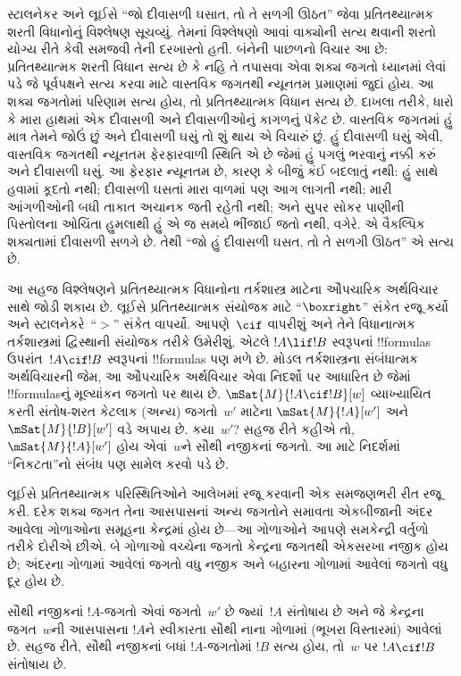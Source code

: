 \documentclass[../../../include/open-logic-section]{subfiles}
\begin{document}


સ્ટાલનેકર અને લૂઈસે ``જો દીવાસળી ઘસાત, તો તે સળગી ઊઠત'' જેવા
પ્રતિતથ્યાત્મક શરતી વિધાનોનું વિશ્લેષણ સૂચવ્યું. તેમનાં વિશ્લેષણો
આવાં વાક્યોની સત્ય થવાની શરતો યોગ્ય રીતે કેવી સમજવી તેની દરખાસ્તો
હતી. બંનેની પાછળનો વિચાર આ છે: પ્રતિતથ્યાત્મક શરતી વિધાન સત્ય છે
કે નહિ તે તપાસવા એવા શક્ય જગતો ધ્યાનમાં લેવાં પડે જે પૂર્વપક્ષને
સત્ય કરવા માટે વાસ્તવિક જગતથી ન્યૂનતમ પ્રમાણમાં જુદાં હોય. આ શક્ય
જગતોમાં પરિણામ સત્ય હોય, તો પ્રતિતથ્યાત્મક વિધાન સત્ય છે. દાખલા
તરીકે, ધારો કે મારા હાથમાં એક દીવાસળી અને દીવાસળીઓનું કાગળનું પૅકેટ
છે. વાસ્તવિક જગતમાં હું માત્ર તેમને જોઉં છું અને દીવાસળી ઘસું તો
શું થાય એ વિચારું છું. હું દીવાસળી ઘસું એવી, વાસ્તવિક જગતથી
ન્યૂનતમ ફેરફારવાળી સ્થિતિ એ છે જેમાં હું પગલું ભરવાનું નક્કી કરું
અને દીવાસળી ઘસું. આ ફેરફાર ન્યૂનતમ છે, કારણ કે બીજું કંઈ બદલાતું
નથી: હું સાથે હવામાં કૂદતો નથી; દીવાસળી ઘસતાં મારા વાળમાં પણ આગ
લાગતી નથી; મારી આંગળીઓની બધી તાકાત અચાનક જતી રહેતી નથી; અને
સુપર સોકર પાણીની પિસ્તોલના ઓચિંતા હુમલાથી હું એ જ સમયે ભીંજાઈ
જતો નથી, વગેરે. એ વૈકલ્પિક શક્યતામાં દીવાસળી સળગે છે. તેથી
``જો હું દીવાસળી ઘસત, તો તે સળગી ઊઠત'' એ સત્ય છે.

આ સહજ વિશ્લેષણને પ્રતિતથ્યાત્મક વિધાનોના તર્કશાસ્ત્ર માટેના ઔપચારિક
અર્થવિચાર સાથે જોડી શકાય છે. લૂઈસે પ્રતિતથ્યાત્મક સંયોજક માટે
``$\boxright$'' સંકેત રજૂ કર્યો અને સ્ટાલનેકરે~``$>$'' સંકેત વાપર્યો.
આપણે~$\cif$ વાપરીશું અને તેને વિધાનાત્મક તર્કશાસ્ત્રમાં દ્વિસ્થાની
સંયોજક તરીકે ઉમેરીશું. એટલે $!A \lif
!B$ સ્વરૂપનાં !!{formula}s ઉપરાંત~$!A \cif !B$ સ્વરૂપનાં
!!{formula}s પણ મળે છે. મોડલ તર્કશાસ્ત્રના સંબંધાત્મક અર્થવિચારની
જેમ, આ ઔપચારિક અર્થવિચાર એવા નિદર્શો પર આધારિત છે જેમાં
!!{formula}sનું મૂલ્યાંકન જગતો પર થાય છે. $\mSat{M}{!A \cif !B}[w]$
વ્યાખ્યાયિત કરતી સંતોષ-શરત કેટલાક (અન્ય) જગતો~$w'$ માટેના
$\mSat{M}{!A}[w']$ અને $\mSat{M}{!B}[w']$ વડે અપાય છે. કયા~$w'$?
સહજ રીતે કહીએ તો, $\mSat{M}{!A}[w']$ હોય એવાં~$w$ને સૌથી નજીકનાં
જગતો. આ માટે નિદર્શમાં ``નિકટતા''નો સંબંધ પણ સામેલ કરવો પડે છે.

લૂઈસે પ્રતિતથ્યાત્મક પરિસ્થિતિઓને આલેખમાં રજૂ કરવાની એક સમજણભરી
રીત રજૂ કરી. દરેક શક્ય જગત તેના આસપાસનાં અન્ય જગતોને સમાવતા
એકબીજાની અંદર આવેલા ગોળાઓના સમૂહના કેન્દ્રમાં હોય છે---આ ગોળાઓને
આપણે સમકેન્દ્રી વર્તુળો તરીકે દોરીએ છીએ. બે ગોળાઓ વચ્ચેના જગતો
કેન્દ્રના જગતથી એકસરખા નજીક હોય છે; અંદરના ગોળામાં આવેલાં જગતો
વધુ નજીક અને બહારના ગોળામાં આવેલાં જગતો વધુ દૂર હોય છે.
\begin{center}
\end{center}
સૌથી નજીકનાં $!A$-જગતો એવાં જગતો~$w'$ છે જ્યાં~$!A$ સંતોષાય છે
અને જે કેન્દ્રના જગત~$w$ની આસપાસના $!A$ને સ્વીકારતા સૌથી નાના ગોળામાં (ભૂખરા
વિસ્તારમાં) આવેલાં છે. સહજ રીતે, સૌથી નજીકનાં બધાં $!A$-જગતોમાં
$!B$ સત્ય હોય, તો~$w$ પર $!A \cif !B$ સંતોષાય છે.
\end{document}

